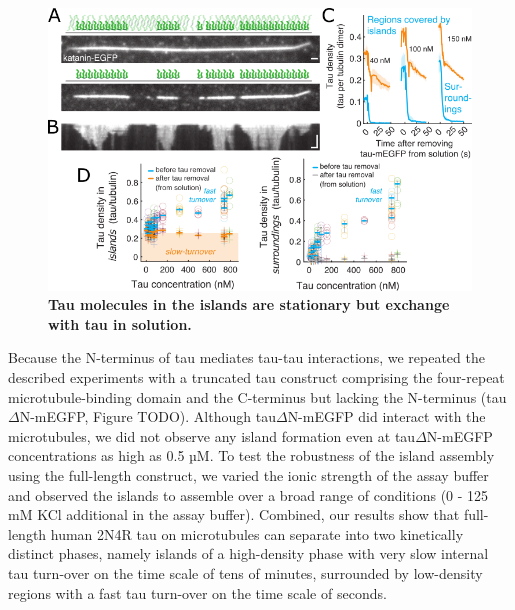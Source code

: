\begin{figure}[h!]
\centering
\includegraphics[width=1\linewidth]{Figures/tau5.png}
\caption[Tau molecules in the islands are stationary but exchange with tau in solution.]{
\textbf{Tau molecules in the islands are stationary but exchange with tau in solution.} 
	}\label{tau5}
\end{figure}

Because the N-terminus of tau mediates tau-tau interactions\parencite{Gamblin2003}, we repeated the described experiments with a truncated tau construct comprising the four-repeat microtubule-binding domain and the C-terminus but lacking the N-terminus (tau$\Delta$N-mEGFP, Figure TODO). Although tau$\Delta$N-mEGFP did interact with the microtubules, we did not observe any island formation even at tau$\Delta$N-mEGFP concentrations as high as 0.5 µM. To test the robustness of the island assembly using the full-length construct, we varied the ionic strength of the assay buffer and observed the islands to assemble over a broad range of conditions (0 - 125 mM KCl additional in the assay buffer). Combined, our results show that full-length human 2N4R tau on microtubules can separate into two kinetically distinct phases, namely islands of a high-density phase with very slow internal tau turn-over on the time scale of tens of minutes, surrounded by low-density regions with a fast tau turn-over on the time scale of seconds.

